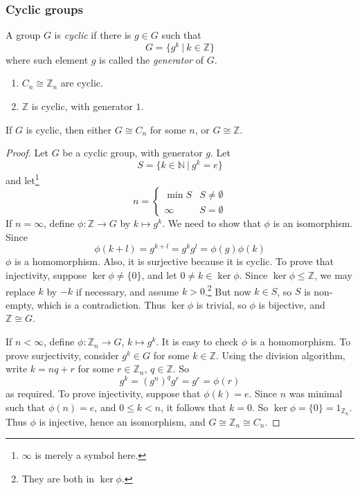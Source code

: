 \documentclass[10pt, a4paper, twoside]{report}
\begin{document}
\subsubsection{Cyclic groups}
\begin{definition}
    A group \(G\) is \emph{cyclic} if there is \(g\in G\) such that 
    \[G=\{g^k\:|\:k\in\mathbb{Z}\}\]
    where such element \(g\) is called the \emph{generator} of \(G\).
\end{definition}
\begin{example} \item[] 
    \begin{enumerate}
        \item \(C_n\cong\mathbb{Z}_n\) are cyclic.
        \item \(\mathbb{Z}\) is cyclic, with generator \(1\).
    \end{enumerate}
\end{example}
\begin{theorem}
    If \(G\) is cyclic, then either \(G\cong C_n\) for some \(n\), or \(G\cong\mathbb{Z}\).
    \label{thm:cyclic_isomor}
\end{theorem}
\begin{proof}
    Let \(G\) be a cyclic group, with generator \(g\). Let 
    \[S=\{k\in\mathbb{N}\:|\:g^k=e\}\]
    and let\footnote{\(\infty\) is merely a symbol here.}
    \[n=\begin{cases}
        \min S & S\neq\emptyset \\
        \infty & S=\emptyset
    \end{cases}\]
    If \(n=\infty\), define \(\phi:\mathbb{Z}\to G\) by \(k\mapsto g^k\). We need to show that \(\phi\) is an isomorphism. Since 
    \[\phi(k+l)=g^{k+l}=g^kg^l=\phi(g)\phi(k)\]
    \(\phi\) is a homomorphism. Also, it is surjective because it is cyclic. To prove that injectivity, suppose \(\ker\phi\neq\{0\}\), and let \(0\neq k\in\ker\phi\). Since \(\ker\phi\leq\mathbb{Z}\), we may replace \(k\) by \(-k\) if necessary, and assume \(k>0\).\footnote{They are both in \(\ker\phi\).} But now \(k\in S\), so \(S\) is non-empty, which is a contradiction. Thus \(\ker\phi\) is trivial, so \(\phi\) is bijective, and \(\mathbb{Z}\cong G\).

    If \(n<\infty\), define \(\phi:\mathbb{Z}_n\to G\), \(k\mapsto g^k\). It is easy to check \(\phi\) is a homomorphism. To prove surjectivity, consider \(g^k\in G\) for some \(k\in\mathbb{Z}\). Using the division algorithm, write \(k=nq+r\) for some \(r\in\mathbb{Z}_n\), \(q\in\mathbb{Z}\). So 
    \[g^k=(g^n)^qg^r=g^r=\phi(r)\]
    as required. To prove injectivity, suppose that \(\phi(k)=e\). Since \(n\) was minimal such that \(\phi(n)=e\), and \(0\leq k<n\), it follows that \(k=0\). So \(\ker\phi=\{0\}=1_{\mathbb{Z}_n}\). Thus \(\phi\) is injective, hence an isomorphism, and \(G\cong\mathbb{Z}_n\cong C_n\).
\end{proof}
\end{document}
